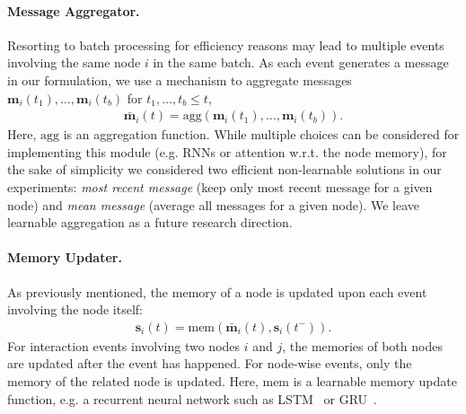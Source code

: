 \documentclass{article}
\begin{document}
\paragraph*{Message Aggregator.}
Resorting to batch processing for efficiency reasons may lead to multiple events involving the same node $i$ in the same batch. As each event generates a message in our formulation, we use a mechanism to aggregate messages $\mathbf{m}_i(t_1), \hdots, \mathbf{m}_i(t_b)$ for $t_1, \hdots, t_b \leq t$,%
\begin{eqnarray}
\bar{\mathbf{m}}_i(t) = \mathrm{agg}\left(\mathbf{m}_i(t_1), \hdots, \mathbf{m}_i(t_b)\right).  %
\end{eqnarray}
%
Here, $\mathrm{agg}$ is an aggregation function.  
While multiple choices can be considered for implementing this module (e.g. RNNs or attention w.r.t. the node memory), for the sake of simplicity we considered two efficient non-learnable solutions in our experiments: {\em most recent message} (keep only most recent message for a given node) and {\em mean message} (average all messages for a given node). We leave learnable aggregation as a future research direction. 



\paragraph*{Memory Updater.}
As previously mentioned, the memory of a node is updated upon each event involving the node itself: \vspace{-2mm}
%
\begin{eqnarray}
    \mathbf{s}_i(t) = \mathrm{mem}\left(\bar{\mathbf{m}}_i(t), \mathbf{s}_i(t^-)\right). %
\end{eqnarray}
%
For interaction events involving two nodes $i$ and $j$, the memories of both nodes are updated after the event has happened. For node-wise events, only the memory of the related node is updated.
Here, $\mathrm{mem}$ is a learnable memory update function, e.g. a recurrent neural network such as LSTM~\citep{10.1162/neco.1997.9.8.1735} or GRU~\citep{cho-etal-2014-learning}. 
\end{document}
